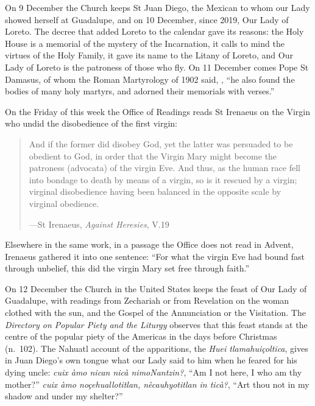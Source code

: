 On 9 December the Church keeps St Juan Diego, the Mexican to whom our Lady
showed herself at Guadalupe, and on 10 December, since 2019, Our Lady of
Loreto. The decree that added Loreto to the calendar gave its reasons: the Holy
House is a memorial of the mystery of the Incarnation, it calls to mind the
virtues of the Holy Family, it gave its name to the Litany of Loreto, and Our
Lady of Loreto is the patroness of those who fly. On 11 December comes Pope St
Damasus, of whom the Roman Martyrology of 1902 said,
, ``he also found the bodies of many holy martyrs, and adorned their
memorials with verses.''

On the Friday of this week the Office of Readings reads St Irenaeus on the Virgin who undid the disobedience of the first virgin:

\begin{quote}
And if the former did disobey God, yet the latter was persuaded to be obedient
to God, in order that the Virgin Mary might become the patroness (advocata) of
the virgin Eve. And thus, as the human race fell into bondage to death by means
of a virgin, so is it rescued by a virgin; virginal disobedience having been
balanced in the opposite scale by virginal obedience.\par
{\smallskip\noindent\small ---St Irenaeus, \emph{Against Heresies}, V.19\par}
\end{quote}

\noindent Elsewhere in the same work, in a passage the Office does not read in
Advent, Irenaeus gathered it into one sentence: ``For what the virgin Eve had bound
fast through unbelief, this did the virgin Mary set free through faith.''

On 12 December the Church in the United States keeps the feast of Our Lady of
Guadalupe, with readings from Zechariah or from Revelation on the woman
clothed with the sun, and the Gospel of the Annunciation or the Visitation. The
\emph{Directory on Popular Piety and the Liturgy} observes that this feast
stands at the centre of the popular piety of the Americas in the days before
Christmas (n.~102). The Nahuatl account of the apparitions, the \emph{Huei
tlamahuiçoltica}, gives in Juan Diego's own tongue what our Lady said to him when
he feared for his dying uncle: \textit{cuix àmo nican nicà nimoNantzin?}, ``Am I
not here, I who am thy mother?'' \textit{cuix àmo noçehuallotitlan,
nècauhyotitlan in ticà?}, ``Art thou not in my shadow and under my shelter?''
